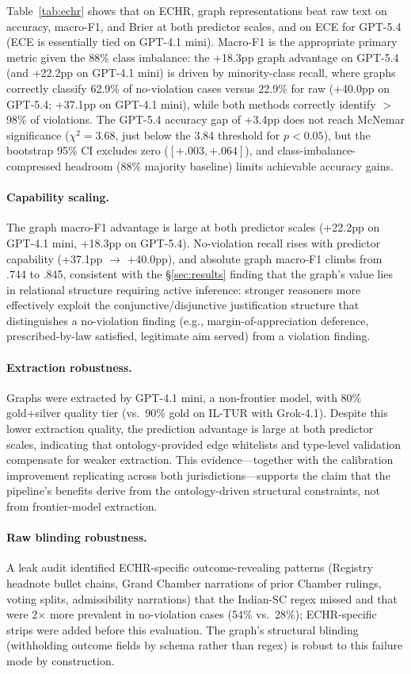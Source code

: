 \documentclass[11pt]{article}
\begin{document}
Table~\ref{tab:echr} shows that on ECHR, graph representations beat raw text on accuracy, macro-F1, and Brier at both predictor scales, and on ECE for GPT-5.4 (ECE is essentially tied on GPT-4.1 mini). Macro-F1 is the appropriate primary metric given the 88\% class imbalance: the +18.3pp graph advantage on GPT-5.4 (and +22.2pp on GPT-4.1 mini) is driven by minority-class recall, where graphs correctly classify 62.9\% of no-violation cases versus 22.9\% for raw (+40.0pp on GPT-5.4; +37.1pp on GPT-4.1 mini), while both methods correctly identify $>$98\% of violations. The GPT-5.4 accuracy gap of +3.4pp does not reach McNemar significance ($\chi^2{=}3.68$, just below the 3.84 threshold for $p{<}0.05$), but the bootstrap 95\% CI excludes zero ($[+.003,+.064]$), and class-imbalance-compressed headroom (88\% majority baseline) limits achievable accuracy gains.

\paragraph{Capability scaling.}
The graph macro-F1 advantage is large at both predictor scales (+22.2pp on GPT-4.1 mini, +18.3pp on GPT-5.4). No-violation recall rises with predictor capability (+37.1pp $\rightarrow$ +40.0pp), and absolute graph macro-F1 climbs from .744 to .845, consistent with the \S\ref{sec:results} finding that the graph's value lies in relational structure requiring active inference: stronger reasoners more effectively exploit the conjunctive/disjunctive justification structure that distinguishes a no-violation finding (e.g., margin-of-appreciation deference, prescribed-by-law satisfied, legitimate aim served) from a violation finding.

\paragraph{Extraction robustness.}
Graphs were extracted by GPT-4.1 mini, a non-frontier model, with 80\% gold+silver quality tier (vs.\ 90\% gold on IL-TUR with Grok-4.1). Despite this lower extraction quality, the prediction advantage is large at both predictor scales, indicating that ontology-provided edge whitelists and type-level validation compensate for weaker extraction. This evidence---together with the calibration improvement replicating across both jurisdictions---supports the claim that the pipeline's benefits derive from the ontology-driven structural constraints, not from frontier-model extraction.

\paragraph{Raw blinding robustness.}
A leak audit identified ECHR-specific outcome-revealing patterns (Registry headnote bullet chains, Grand Chamber narrations of prior Chamber rulings, voting splits, admissibility narrations) that the Indian-SC regex missed and that were 2$\times$ more prevalent in no-violation cases (54\% vs.\ 28\%); ECHR-specific strips were added before this evaluation. The graph's structural blinding (withholding outcome fields by schema rather than regex) is robust to this failure mode by construction.
\end{document}
